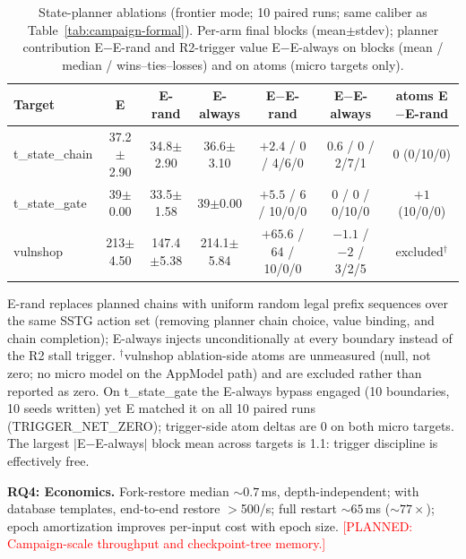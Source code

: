 \documentclass[letterpaper,twocolumn,10pt]{article}
\newcommand{\planned}[1]{\textcolor{red}{[PLANNED: #1]}}
\begin{document}
\begin{table}[t]
\centering
\small
\caption{State-planner ablations (frontier mode; 10 paired runs; same caliber as Table~\ref{tab:campaign-formal}). Per-arm final blocks (mean$\pm$stdev); planner contribution E$-$E-rand and R2-trigger value E$-$E-always on blocks (mean / median / wins--ties--losses) and on atoms (micro targets only).}
\label{tab:ablation-formal}
\begin{tabular}{lcccccc}
\hline
Target & E & E-rand & E-always & E$-$E-rand & E$-$E-always & atoms E$-$E-rand \\
\hline
t\_state\_chain & 37.2$\pm$2.90 & 34.8$\pm$2.90 & 36.6$\pm$3.10 & $+2.4$ / 0 / 4/6/0 & $0.6$ / $0$ / 2/7/1 & $0$ (0/10/0) \\
t\_state\_gate & 39$\pm$0.00 & 33.5$\pm$1.58 & 39$\pm$0.00 & $+5.5$ / 6 / 10/0/0 & $0$ / $0$ / 0/10/0 & $+1$ (10/0/0) \\
vulnshop & 213$\pm$4.50 & 147.4$\pm$5.38 & 214.1$\pm$5.84 & $+65.6$ / 64 / 10/0/0 & $-1.1$ / $-2$ / 3/2/5 & excluded$^{\dagger}$ \\
\hline
\end{tabular}

\begin{minipage}{\textwidth}
\footnotesize
E-rand replaces planned chains with uniform random legal prefix sequences over the same SSTG action set (removing planner chain choice, value binding, and chain completion); E-always injects unconditionally at every boundary instead of the R2 stall trigger. $^{\dagger}$vulnshop ablation-side atoms are unmeasured (null, not zero; no micro model on the AppModel path) and are excluded rather than reported as zero. On t\_state\_gate the E-always bypass engaged (10 boundaries, 10 seeds written) yet E matched it on all 10 paired runs (TRIGGER\_NET\_ZERO); trigger-side atom deltas are 0 on both micro targets. The largest $|$E$-$E-always$|$ block mean across targets is 1.1: trigger discipline is effectively free.
\end{minipage}
\end{table}


\textbf{RQ4: Economics.} Fork-restore median ${\sim}0.7$\,ms, depth-independent; with database templates, end-to-end restore $>$500/s; full restart ${\sim}65$\,ms (${\sim}77\times$); epoch amortization improves per-input cost with epoch size. \planned{Campaign-scale throughput and checkpoint-tree memory.} %
\end{document}
